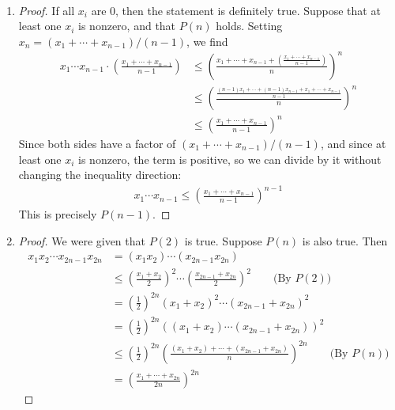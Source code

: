 \documentclass[12pt]{article}
\newenvironment{sol}[1][Solution]{\begin{trivlist}
		\item[\hskip \labelsep {\bfseries #1:}]}{\end{trivlist}}
\begin{document}
\begin{sol}
	\
	\begin{enumerate}[label=(\alph*)]
		\item \begin{proof}
			If all $x_i$ are 0, then the statement is definitely true.
			Suppose that at least one $x_i$ is nonzero, and that $P(n)$ holds.
			Setting $x_n=(x_1+\cdots+x_{n-1})/(n-1)$, we find
			\begin{align*}
				x_1\cdots x_{n-1}\cdot \left(\frac{x_1+\cdots+x_{n-1}}{n-1}\right)
				&\leq
				\left(\frac{x_1+\cdots+x_{n-1}+
				\left(\frac{x_1+\cdots+x_{n-1}}{n-1}\right)
				}{n}\right)^n\\
				&\leq \left(
				\frac{
					\frac{(n-1)x_1+\cdots+(n-1)x_{n-1}+x_1+\cdots+x_{n-1}}{n-1}
				}{n}
				\right)^n\\
				&\leq \left(
				\frac{x_1+\cdots+x_{n-1}}{n-1}
				\right)^n
			\end{align*}
			Since both sides have a factor of $(x_1+\cdots+x_{n-1})/(n-1)$, and since
			at least one $x_i$ is nonzero, the term is positive, so we can divide by it
			without changing the inequality direction:
			\begin{align*}
				x_1\cdots x_{n-1}\leq \left(\frac{x_1+\cdots+x_{n-1}}{n-1}\right)^{n-1}
			\end{align*}
			This is precisely $P(n-1)$.
		\end{proof}
		\item \begin{proof}
			We were given that $P(2)$ is true. Suppose $P(n)$ is also true. Then
			\begin{align*}
				x_1x_2\cdots x_{2n-1}x_{2n}	&=(x_1x_2)\cdots (x_{2n-1}x_{2n})\\
				&\leq
				\left(\frac{x_1+x_2}{2}\right)^2\cdots \left(\frac{x_{2n-1}+x_{2n}}{2}\right)^2
				\qquad\text{(By $P(2)$)}\\
				&=
				\left(
				\frac{1}{2}
				\right)^{2n}
				(x_1+x_2)^2\cdots (x_{2n-1}+x_{2n})^2\\
				&=\left(
				\frac{1}{2}
				\right)^{2n}
				\left((x_1+x_2)\cdots (x_{2n-1}+x_{2n})\right)^2\\
				&\leq\left(
				\frac{1}{2}
				\right)^{2n}
				\left(
				\frac{(x_1+x_2)+\cdots +(x_{2n-1}+x_{2n})}{n}
				\right)^{2n}\qquad\text{(By $P(n)$)}\\
				&=\left(
				\frac{x_1+\cdots+x_{2n}}{2n}
				\right)^{2n}
			\end{align*}
			

\end{proof}
\end{enumerate}
\end{sol}
\end{document}
